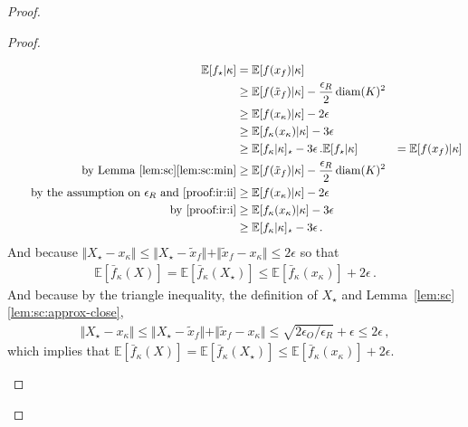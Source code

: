 \documentclass[letter, 12pt]{report}
\newcommand{\epsR}{{\epsilon_R}}
\newcommand{\epsO}{{\epsilon_O}}
\newcommand{\snorm}[1]{ \Vert  #1 \Vert}
\newcommand{\E}{\mathbb E}
\newcommand{\diam}{\operatorname{diam}}
\newcommand{\1}{\mathbf{1}}
\theoremstyle{plain}
\theoremstyle{definition}
\theoremstyle{remark}
\begin{document}
\begin{proof}
\begin{proof}
\begin{enumerate}
                  \begin{align*}
                      \E[f_\star|\kappa]
                       & = \E[f(x_f)|\kappa]                                        \\
                       & \geq \E[f(\tilde x_f)|\kappa] - \frac{\epsR}{2} \diam(K)^2 \\
                       & \geq \E[f(x_\kappa)|\kappa] - 2\epsilon                    \\
                       & \geq \E[f_\kappa(x_\kappa)|\kappa] - 3\epsilon             \\
                       & \geq \E[f_\kappa|\kappa]_\star - 3\epsilon \,.
                      \E[f_\star|\kappa]
                       & = \E[f(x_f)|\kappa]                                        \\
                      \tag*{by Lemma~\ref{lem:sc}\ref{lem:sc:min}}
                       & \geq \E[f(\tilde x_f)|\kappa] - \frac{\epsR}{2} \diam(K)^2 \\
                      \tag*{by the assumption on $\epsR$ and \ref{proof:ir:ii}}
                       & \geq \E[f(x_\kappa)|\kappa] - 2\epsilon                    \\
                      \tag*{by \ref{proof:ir:i}}
                       & \geq \E[f_\kappa(x_\kappa)|\kappa] - 3\epsilon             \\
                       & \geq \E[f_\kappa|\kappa]_\star - 3\epsilon \,.
                  \end{align*}
                  And because $\snorm{X_\star - x_\kappa} \leq \snorm{X_\star - \tilde x_f} + \snorm{\tilde x_f - x_\kappa} \leq 2 \epsilon$ so that
                  \begin{align*}
                      \E[\bar f_\kappa(X)] = \E[\bar f_\kappa(X_\star)] \leq \E[\bar f_\kappa(x_\kappa)] + 2 \epsilon \,.
                  \end{align*}
                  And because by the triangle inequality, the definition of $X_\star$ and Lemma~\ref{lem:sc}\ref{lem:sc:approx-close},
                  \begin{align}
                      \snorm{X_\star - x_\kappa}
                      \leq \snorm{X_\star - \tilde x_f} + \snorm{\tilde x_f - x_\kappa}
                      \leq \sqrt{2\epsO / \epsR} + \epsilon
                      \leq 2 \epsilon\,,
                      \label{eq:ir:3}
                  \end{align}
                  which implies that $\E[\bar f_\kappa(X)] = \E[\bar f_\kappa(X_\star)] \leq \E[\bar f_\kappa(x_\kappa)] + 2 \epsilon$.

\end{enumerate}
\end{proof}
\end{proof}
\end{document}
